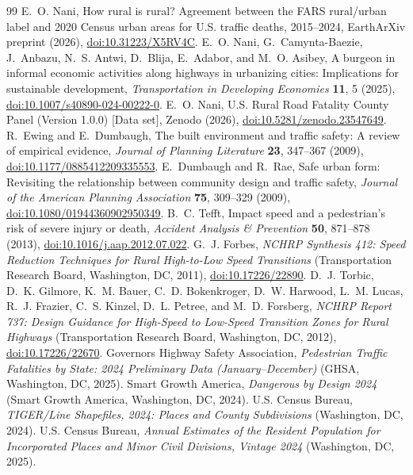 \documentclass[11pt,letterpaper]{article}
\newcommand{\doi}[1]{\href{https://doi.org/#1}{doi:#1}}
\begin{document}
\nolinenumbers
\begin{thebibliography}{99}
\setlength{\itemsep}{2pt}
\small
{} E.~O. Nani, How rural is rural? Agreement between the FARS rural/urban label and 2020 Census urban areas for U.S. traffic deaths, 2015--2024, EarthArXiv preprint (2026), \doi{10.31223/X5RV4C}.
 E.~O. Nani, G.~Camynta-Baezie, J.~Anbazu, N.~S. Antwi, D.~Blija, E.~Adabor, and M.~O. Asibey, A burgeon in informal economic activities along highways in urbanizing cities: Implications for sustainable development, \emph{Transportation in Developing Economies} \textbf{11}, 5 (2025), \doi{10.1007/s40890-024-00222-0}.
 E.~O. Nani, U.S. Rural Road Fatality County Panel (Version 1.0.0) [Data set], Zenodo (2026), \doi{10.5281/zenodo.23547649}.
 R.~Ewing and E.~Dumbaugh, The built environment and traffic safety: A review of empirical evidence, \emph{Journal of Planning Literature} \textbf{23}, 347--367 (2009), \doi{10.1177/0885412209335553}.
 E.~Dumbaugh and R.~Rae, Safe urban form: Revisiting the relationship between community design and traffic safety, \emph{Journal of the American Planning Association} \textbf{75}, 309--329 (2009), \doi{10.1080/01944360902950349}.
 B.~C. Tefft, Impact speed and a pedestrian's risk of severe injury or death, \emph{Accident Analysis \& Prevention} \textbf{50}, 871--878 (2013), \doi{10.1016/j.aap.2012.07.022}.
 G.~J. Forbes, \emph{NCHRP Synthesis 412: Speed Reduction Techniques for Rural High-to-Low Speed Transitions} (Transportation Research Board, Washington, DC, 2011), \doi{10.17226/22890}.
 D.~J. Torbic, D.~K. Gilmore, K.~M. Bauer, C.~D. Bokenkroger, D.~W. Harwood, L.~M. Lucas, R.~J. Frazier, C.~S. Kinzel, D.~L. Petree, and M.~D. Forsberg, \emph{NCHRP Report 737: Design Guidance for High-Speed to Low-Speed Transition Zones for Rural Highways} (Transportation Research Board, Washington, DC, 2012), \doi{10.17226/22670}.
 Governors Highway Safety Association, \emph{Pedestrian Traffic Fatalities by State: 2024 Preliminary Data (January--December)} (GHSA, Washington, DC, 2025).
 Smart Growth America, \emph{Dangerous by Design 2024} (Smart Growth America, Washington, DC, 2024).
 U.S. Census Bureau, \emph{TIGER/Line Shapefiles, 2024: Places and County Subdivisions} (Washington, DC, 2024).
 U.S. Census Bureau, \emph{Annual Estimates of the Resident Population for Incorporated Places and Minor Civil Divisions, Vintage 2024} (Washington, DC, 2025).

\end{thebibliography}
\end{document}
